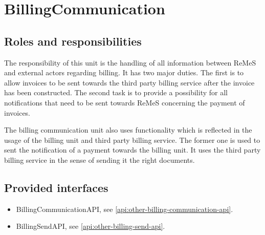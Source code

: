\section{BillingCommunication}
\label{element:billing-communication}

\subsection{Roles and responsibilities}

\npar The responsibility of this unit is the handling of all information between
ReMeS and external actors regarding billing. It has two major duties. The first
is to allow invoices to be sent towards the third party billing service after
the invoice has been constructed. The second task is to provide a possibility
for all notifications that need to be sent towards ReMeS concerning the payment
of invoices.

\npar The billing communication unit also uses functionality which is reflected
in the usage of the billing unit and third party billing service. The former one
is used to sent the notification of a payment towards the billing unit. It uses
the third party billing service in the sense of sending it the right documents.

\subsection{Provided interfaces}

\begin{itemize}
  \item BillingCommunicationAPI, see \ref{api:other-billing-communication-api}.
  \item BillingSendAPI, see \ref{api:other-billing-send-api}.
\end{itemize}